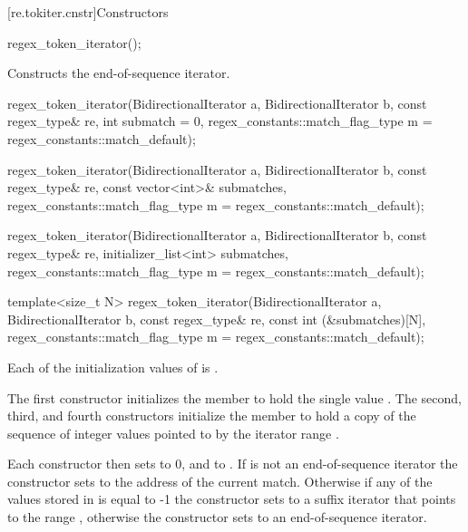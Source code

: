 [re.tokiter.cnstr]{Constructors}

%
\begin{itemdecl}
regex_token_iterator();
\end{itemdecl}

\begin{itemdescr}
\pnum
\effects
Constructs the end-of-sequence iterator.
\end{itemdescr}

%
\begin{itemdecl}
regex_token_iterator(BidirectionalIterator a, BidirectionalIterator b,
                     const regex_type& re,
                     int submatch = 0,
                     regex_constants::match_flag_type m = regex_constants::match_default);

regex_token_iterator(BidirectionalIterator a, BidirectionalIterator b,
                     const regex_type& re,
                     const vector<int>& submatches,
                     regex_constants::match_flag_type m = regex_constants::match_default);

regex_token_iterator(BidirectionalIterator a, BidirectionalIterator b,
                     const regex_type& re,
                     initializer_list<int> submatches,
                     regex_constants::match_flag_type m = regex_constants::match_default);

template<size_t N>
  regex_token_iterator(BidirectionalIterator a, BidirectionalIterator b,
                       const regex_type& re,
                       const int (&submatches)[N],
                       regex_constants::match_flag_type m = regex_constants::match_default);
\end{itemdecl}

\begin{itemdescr}
\pnum
\expects
Each of the initialization values of  is .

\pnum
\effects
The first constructor initializes the member  to hold the single
value .
The second, third, and fourth constructors
initialize the member  to hold a copy of the sequence of integer values
pointed to by the iterator range
.

\pnum
Each constructor then sets  to 0, and  to
. If  is not an
end-of-sequence iterator the constructor sets  to the
address of the current match. Otherwise if any of the values stored
in  is equal to -1 the constructor sets  to a suffix
iterator that points to the range , otherwise the constructor
sets  to an end-of-sequence iterator.
\end{itemdescr}

